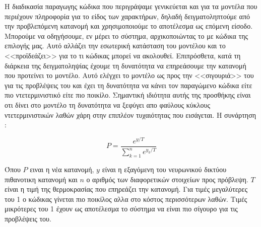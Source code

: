 Η διαδικασία παραγωγης κώδικα που περιγράψαμε γενικεύεται και για τα μοντέλα που περιέχουν πληροφορία για το είδος των χαρακτήρων, δηλαδή δειγματοληπτούμε από την προβλεπόμενη κατανομή και χρησιμοποιούμε το αποτέλεσμα ως επόμενη είσοδο.
Μπορούμε να οδηγήσουμε, εν μέρει το σύστημα, αρχικοποιώντας το με κώδικα της επιλογής μας. Αυτό αλλάζει την εσωτερική κατάσταση του μοντέλου και το <<προϊδεάζει>> για το τι κώδικας μπορεί να ακολουθεί. 
Επιπρόσθετα, κατά τη διάρκεια της δειγματοληψίας έχουμε τη δυνατότητα να επηρεάσουμε την κατανομή που προτείνει το μοντέλο.
Αυτό ελέγχει το μοντέλο ως προς την <<σιγουριά>> του για τις προβλέψεις του και έχει τη δυνατότητα να κάνει τον παραγώμενο κώδικα είτε πιο ντετερμινιστικό είτε πιο ποικίλο.
Σημαντική ιδιότητα αυτής της προσθήκης είναι οτι δίνει στο μοντέλο τη δυνατότητα να ξεφύγει απο φαύλους κύκλους ντετερμινιστικών λαθών χάρη στην επιπλέον τυχαιότητας που εισάγεται.
Η συνάρτηση : 

\begin{equation}
P = \frac{e^{y/T}}{\sum_{k = 1}^{n} e^{y_k/T}}
\end{equation}

Όπου $P$ ειναι η νέα κατανομή, $y$ είναι η εξαγόμενη του νευρωνικού δικτύου πιθανοτικη κατανομή και $n$ ο αριθμός των διαφορετικών στοιχείων προς πρόβλεψη. $T$ είναι η τιμή της θερμοκρασίας που επηρεάζει την  κατανομή.
Για τιμές μεγαλύτερες του 1 ο κώδικας γίνεται πιο ποικίλος αλλα στο κόστος περισσότερων λαθών.
Τιμές μικρότερες του 1 έχουν ως αποτέλεσμα το σύστημα να είναι πιο σίγουρο για τις προβλέψεις του.



